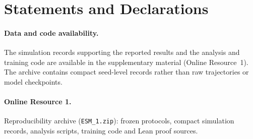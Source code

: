 \documentclass[10pt]{article}
\begin{document}
\section*{Statements and Declarations}
\paragraph{Data and code availability.}
The simulation records supporting the reported results and the analysis and
training code are available in the supplementary material (Online Resource~1).
The archive contains compact seed-level records rather than raw trajectories
or model checkpoints.

\paragraph{Online Resource 1.}
Reproducibility archive (\texttt{ESM\_1.zip}): frozen protocols, compact
simulation records, analysis scripts, training code and Lean proof sources.





\end{document}
